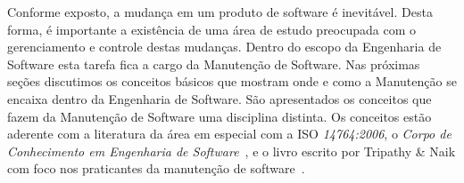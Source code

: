 Conforme exposto, a mudança em um produto de software é inevitável. Desta forma,
é importante a existência de uma área de estudo preocupada com o gerenciamento e
controle destas mudanças. Dentro do escopo da Engenharia de Software esta tarefa
fica a cargo da Manutenção de Software.  Nas próximas seções discutimos os
conceitos básicos que mostram onde e como a Manutenção se encaixa dentro da
Engenharia de Software. São apresentados os conceitos que fazem da Manutenção de
Software uma disciplina distinta.
Os conceitos estão aderente com a literatura da área em especial com a ISO
\textit{14764:2006}, o \textit{Corpo de Conhecimento em Engenharia de
	Software}~\cite{4425813}, e o livro escrito por Tripathy \& Naik com foco
nos praticantes da manutenção de software~\cite{tripathy2014software}.
%
%
